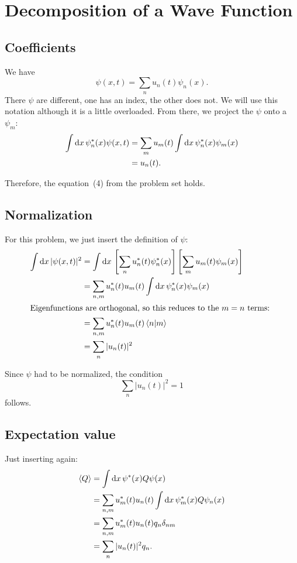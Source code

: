 \documentclass[11pt, ngerman, fleqn, DIV=15, headinclude, BCOR=1cm]{scrartcl}
\begin{document}
\section{Decomposition of a Wave Function}

\subsection{Coefficients}

We have
\[
    \psi(x, t) = \sum_n u_n(t) \psi_n(x).
\]
There $\psi$ are different, one has an index, the other does not. We will use
this notation although it is a little overloaded. From there, we project the
$\psi$ onto a $\psi_m$:
\begin{align*}
    \int \dif x \, \psi_n^*(x) \psi(x, t)
    &= \sum_m u_m (t) \int \dif x \, \psi_n^*(x) \psi_m(x) \\
    &= u_n(t).
\end{align*}

Therefore, the equation~(4) from the problem set holds.

\subsection{Normalization}

For this problem, we just insert the definition of $\psi$:
\begin{align*}
    \int \dif x \, |\psi(x, t)|^2
    &= \int \dif x \, \sbr{\sum_n u_n^*(t) \psi_n^*(x)} \sbr{\sum_m u_m(t)
    \psi_m(x)} \\
    &= \sum_{n,m} u_n^*(t) u_m(t) \int \dif x \, \psi_n^*(x) \psi_m(x) \\
    \intertext{%
        Eigenfunctions are orthogonal, so this reduces to the $m = n$ terms:
    }
    &= \sum_{n,m} u_n^*(t) u_m(t) \braket{n|m} \\
    &= \sum_{n} |u_n(t)|^2
\end{align*}

Since $\psi$ had to be normalized, the condition
\[
    \sum_{n} |u_n(t)|^2 = 1
\]
follows.

\subsection{Expectation value}

Just inserting again:
\begin{align*}
    \bracket Q
    &= \int \dif x \, \psi^*(x) Q \psi(x) \\
    &= \sum_{n, m} u_m^*(t) u_n(t) \int \dif x \, \psi_m^*(x) Q \psi_n(x) \\
    &= \sum_{n, m} u_m^*(t) u_n(t) q_n \delta_{nm} \\
    &= \sum_{n} |u_n(t)|^2 q_n .
\end{align*}
\end{document}
